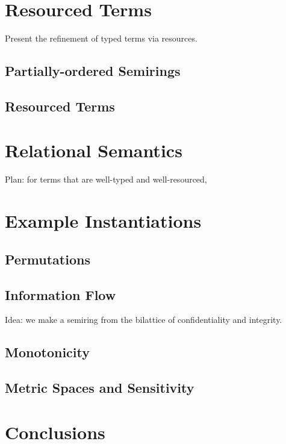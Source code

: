\documentclass[sigplan,review]{acmart}\settopmatter{printfolios=true,printccs=false,printacmref=false}
\begin{document}
\section{Resourced Terms}

Present the refinement of typed terms via resources.

\subsection{Partially-ordered Semirings}

\subsection{Resourced Terms}

\section{Relational Semantics}

Plan: for terms that are well-typed and well-resourced, 

\section{Example Instantiations}

\subsection{Permutations}

\subsection{Information Flow}

Idea: we make a semiring from the bilattice of confidentiality and
integrity.

\subsection{Monotonicity}

\subsection{Metric Spaces and Sensitivity}

\section{Conclusions}
\end{document}
